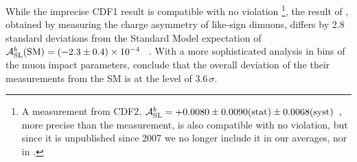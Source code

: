 While the imprecise CDF1 result is compatible with no \CP violation%
\footnote{
  \label{foot:life_mix:CDFnote9015:2007-2}
  A measurement from CDF2, 
$ {\cal A}_{\rm SL}^b = +0.0080 \pm 0.0090 \mbox{(stat)} \pm 0.0068 \mbox{(syst)}$~\cite{CDFnote9015:2007},
more precise than the \dzero measurement,
is also compatible with no \CP violation,
but since it is unpublished since 2007 
we no longer include it in our averages, nor in .},
the \dzero result of , obtained by measuring
the charge asymmetry of like-sign dimuons, differs by 2.8 standard
deviations from the Standard Model expectation of
${\cal A}_{\rm SL}^b({\mathrm{SM}}) = (-2.3\pm 0.4) \times 10^{-4}$%
~\cite{Abazov:2013uma,*Abazov:2011yk_mod,*Abazov:2010hv_mod_cont,*Abazov:2010hj_mod_cont,*Abazov:2011yk_cont,Lenz:2011ti,*Lenz:2006hd}.
With a more sophisticated analysis in bins of the
muon impact parameters, \dzero conclude that the overall deviation of the 
their measurements from the SM is at the level of $3.6\,\sigma$.

